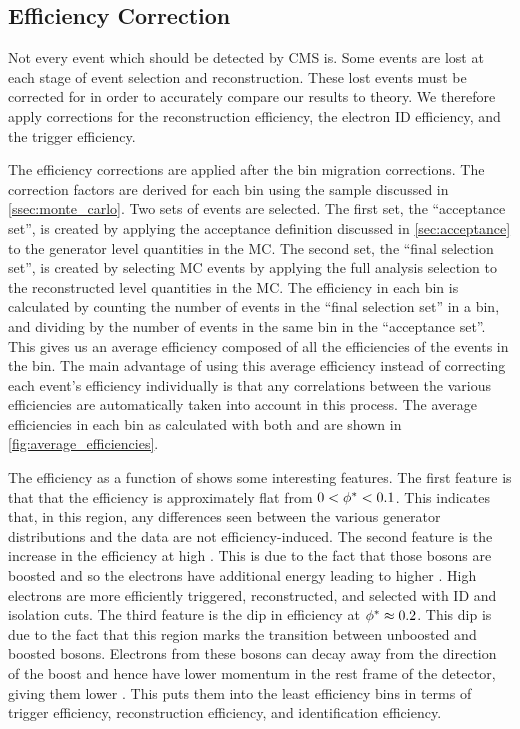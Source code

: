 \subsection{Efficiency Correction}
\label{ssec:eff_correction}

Not every event which should be detected by CMS is. Some events are lost at
each stage of event selection and reconstruction. These lost events must be
corrected for in order to accurately compare our results to theory. We
therefore apply corrections for the reconstruction efficiency, the electron ID
efficiency, and the trigger efficiency.

The efficiency corrections are applied after the bin migration corrections. The
correction factors are derived for each \phistar bin using the \Ztoee \MADGRAPH
sample discussed in \cref{ssec:monte_carlo}. Two sets of events are
selected. The first set, the ``acceptance set'', is created by applying the
acceptance definition discussed in \cref{sec:acceptance} to the generator
level quantities in the MC. The second set, the ``final selection set'', is
created by selecting MC events by applying the full analysis selection to the
reconstructed level quantities in the MC. The efficiency in each \phistar bin
is calculated by counting the number of events in the ``final selection set''
in a bin, and dividing by the number of events in the same bin in the
``acceptance set''. This gives us an average efficiency composed of all the
efficiencies of the events in the bin. The main advantage of using this average
efficiency instead of correcting each event's efficiency individually is that
any correlations between the various efficiencies are automatically taken into
account in this process. The average efficiencies in each bin as calculated with
both \MADGRAPH and \POWHEG are shown in \cref{fig:average_efficiencies}.

The efficiency as a function of \phistar shows some interesting features. The
first feature is that that the efficiency is approximately flat from $0 <
\phi^{*} < 0.1$. This indicates that, in this region, any differences seen
between the various generator \phistar distributions and the data are not
efficiency-induced. The second feature is the increase in the efficiency at
high \phistar. This is due to the fact that those \Z bosons are boosted and so
the electrons have additional energy leading to higher \pt. High \pt electrons
are more efficiently triggered, reconstructed, and selected with ID and
isolation cuts. The third feature is the dip in efficiency at $\phi^{*} \approx
0.2$. This dip is due to the fact that this \phistar region marks the
transition between unboosted and boosted \Z bosons. Electrons from these \Z
bosons can decay away from the direction of the boost and hence have lower
momentum in the rest frame of the detector, giving them lower \pt. This puts
them into the least efficiency bins in terms of trigger efficiency,
reconstruction efficiency, and identification efficiency.

